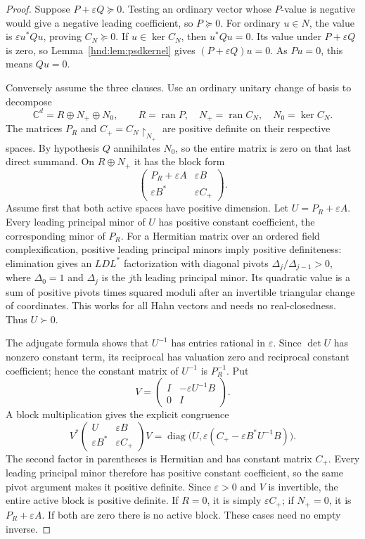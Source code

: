 \documentclass[11pt,oneside]{article}
\theoremstyle{definition}
\theoremstyle{remark}
\newcommand{\C}{\mathbb C}
\newcommand{\diag}{\operatorname{diag}}
\newcommand{\eps}{\varepsilon}
\newcommand{\restr}[2]{{#1}\!\upharpoonright_{#2}}
\begin{document}
\begin{proof}
Suppose $P+\eps Q\succeq0$. Testing an ordinary vector whose $P$-value
is negative would give a negative leading coefficient, so $P\succeq0$.
For ordinary $u\in N$, the value is $\eps u^*Qu$, proving
$C_N\succeq0$. If $u\in\ker C_N$, then $u^*Qu=0$.
Its value under $P+\eps Q$ is zero, so
Lemma~\ref{hnd:lem:psdkernel} gives $(P+\eps Q)u=0$.
As $Pu=0$, this means $Qu=0$.

Conversely assume the three clauses. Use an ordinary unitary change of
basis to decompose
\[
 \C^d=R\oplus N_+\oplus N_0,
 \qquad R=\operatorname{ran}P,
 \quad N_+=\operatorname{ran}C_N,
 \quad N_0=\ker C_N.
\]
The matrices $P_R$ and $C_+=\restr{C_N}{N_+}$ are positive definite on
their respective spaces. By hypothesis $Q$ annihilates $N_0$, so the
entire matrix is zero on that last direct summand. On $R\oplus N_+$ it
has the block form
\begin{equation}\label{hnd:eq:activeblock}
 \begin{pmatrix}
 P_R+\eps A&\eps B\\
 \eps B^*&\eps C_+
 \end{pmatrix}.
\end{equation}
Assume first that both active spaces have positive dimension.
Let $U=P_R+\eps A$. Every leading principal minor of $U$ has positive
constant coefficient, the corresponding minor of $P_R$.
For a Hermitian matrix over an ordered field complexification, positive
leading principal minors imply positive definiteness: elimination gives
an $LDL^*$ factorization with diagonal pivots
$\Delta_j/\Delta_{j-1}>0$, where $\Delta_0=1$ and $\Delta_j$ is the
$j$th leading principal minor. Its quadratic value is a sum of positive
pivots times squared moduli after an invertible triangular change of
coordinates. This works for all Hahn vectors and needs no real-closedness.
Thus $U\succ0$.

The adjugate formula shows that $U^{-1}$ has entries rational in $\eps$.
Since $\det U$ has nonzero constant term, its reciprocal has valuation
zero and reciprocal constant coefficient; hence the constant matrix of
$U^{-1}$ is $P_R^{-1}$. Put
\[
 V=\begin{pmatrix}I&-\eps U^{-1}B\\0&I\end{pmatrix}.
\]
A block multiplication gives the explicit congruence
\[
 V^*\begin{pmatrix}U&\eps B\\\eps B^*&\eps C_+\end{pmatrix}V
 =\diag\bigl(U,\eps(C_+-\eps B^*U^{-1}B)\bigr).
\]
The second factor in parentheses is Hermitian and has constant matrix
$C_+$. Every leading principal minor therefore has positive constant
coefficient, so the same pivot argument makes it positive definite.
Since $\eps>0$ and $V$ is invertible, the entire active block is
positive definite. If $R=0$, it is simply $\eps C_+$; if $N_+=0$,
it is $P_R+\eps A$. If both are zero there is no active block.
These cases need no empty inverse.


\end{proof}
\end{document}
